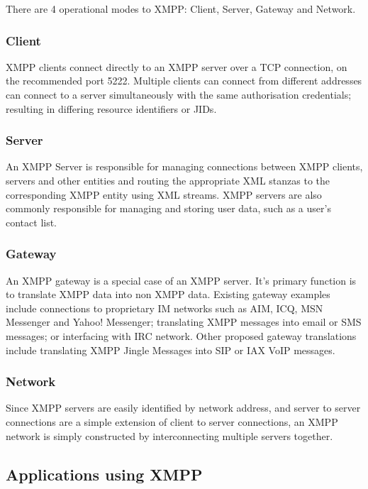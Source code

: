 There are 4 operational modes to XMPP: Client, Server, Gateway and
Network.

\subsubsection{Client}

XMPP clients connect directly to an XMPP server over a TCP connection,
on the recommended port 5222. Multiple clients can connect from 
different addresses can connect to a server simultaneously with the same 
authorisation credentials; resulting in differing resource identifiers
or JIDs.

\subsubsection{Server}

An XMPP Server is responsible for managing connections between XMPP
clients, servers and other entities and routing the appropriate XML stanzas
to the corresponding XMPP entity using XML streams. XMPP servers are
also commonly responsible for managing and storing user data, such as a
user's contact list.

\subsubsection{Gateway}

An XMPP gateway is a special case of an XMPP server. It's primary
function is to translate XMPP data into non XMPP data. Existing gateway 
examples include connections to proprietary IM networks such as AIM, ICQ,
MSN Messenger and Yahoo! Messenger; translating XMPP messages into email 
or SMS messages; or interfacing with IRC network. Other proposed gateway
translations include translating XMPP Jingle Messages into SIP or IAX
VoIP messages.

\subsubsection{Network}

Since XMPP servers are easily identified by network address, and server
to server connections are a simple extension of client to server
connections, an XMPP network is simply constructed by interconnecting
multiple servers together.

\subsection{Applications using XMPP}

